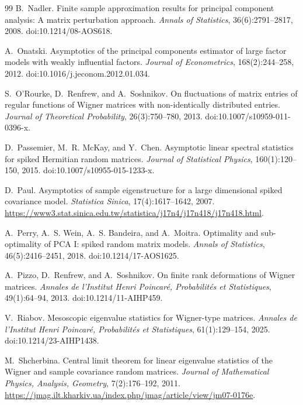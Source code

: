 \documentclass[11pt]{article}
\theoremstyle{definition}
\theoremstyle{remark}
\begin{document}
\begin{thebibliography}{99}
B.~Nadler.
\newblock Finite sample approximation results for principal component analysis: A matrix perturbation approach.
\newblock \emph{Annals of Statistics}, 36(6):2791--2817, 2008.
\newblock doi:10.1214/08-AOS618.

A.~Onatski.
\newblock Asymptotics of the principal components estimator of large factor models with weakly influential factors.
\newblock \emph{Journal of Econometrics}, 168(2):244--258, 2012.
\newblock doi:10.1016/j.jeconom.2012.01.034.

S.~O'Rourke, D.~Renfrew, and A.~Soshnikov.
\newblock On fluctuations of matrix entries of regular functions of Wigner
matrices with non-identically distributed entries.
\newblock \emph{Journal of Theoretical Probability}, 26(3):750--780, 2013.
\newblock doi:10.1007/s10959-011-0396-x.

D.~Passemier, M.~R. McKay, and Y.~Chen.
\newblock Asymptotic linear spectral statistics for spiked Hermitian random matrices.
\newblock \emph{Journal of Statistical Physics}, 160(1):120--150, 2015.
\newblock doi:10.1007/s10955-015-1233-x.

D.~Paul.
\newblock Asymptotics of sample eigenstructure for a large dimensional spiked covariance model.
\newblock \emph{Statistica Sinica}, 17(4):1617--1642, 2007.
\newblock \url{https://www3.stat.sinica.edu.tw/statistica/j17n4/j17n418/j17n418.html}.

A.~Perry, A.~S. Wein, A.~S. Bandeira, and A.~Moitra.
\newblock Optimality and sub-optimality of PCA I: spiked random matrix models.
\newblock \emph{Annals of Statistics}, 46(5):2416--2451, 2018.
\newblock doi:10.1214/17-AOS1625.

A.~Pizzo, D.~Renfrew, and A.~Soshnikov.
\newblock On finite rank deformations of Wigner matrices.
\newblock \emph{Annales de l'Institut Henri Poincar\'{e}, Probabilit\'{e}s et
Statistiques}, 49(1):64--94, 2013.
\newblock doi:10.1214/11-AIHP459.

V.~Riabov.
\newblock Mesoscopic eigenvalue statistics for Wigner-type matrices.
\newblock \emph{Annales de l'Institut Henri Poincar\'{e}, Probabilit\'{e}s et
Statistiques}, 61(1):129--154, 2025.
\newblock doi:10.1214/23-AIHP1438.

M.~Shcherbina.
\newblock Central limit theorem for linear eigenvalue statistics of the Wigner and sample covariance random matrices.
\newblock \emph{Journal of Mathematical Physics, Analysis, Geometry}, 7(2):176--192, 2011.
\newblock \url{https://jmag.ilt.kharkiv.ua/index.php/jmag/article/view/jm07-0176e}.


\end{thebibliography}
\end{document}
